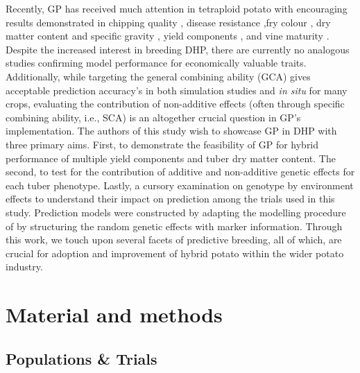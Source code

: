 Recently, GP has received much attention in tetraploid potato with encouraging results demonstrated in chipping quality \parencite{Sverrisdottir2018, Pandey2022}, disease resistance \parencite{Enciso-Rodriguez2018, Ortiz2022},fry colour \parencite{Byrne2020}, dry matter content and specific gravity \parencite{Endelman2018, Sverrisdottir2018}, yield components \parencite{Endelman2018, Wilson2021, Ortiz2022, Cuevas2022}, and vine maturity \parencite{Slater2016, Pandey2022}. Despite the increased interest in breeding DHP, there are currently no analogous studies confirming model performance for economically valuable traits. Additionally, while targeting the general combining ability (GCA) gives acceptable prediction accuracy's in both simulation studies and \textit{in situ} for many crops, evaluating the contribution of non-additive effects (often through specific combining ability, i.e., SCA) is an altogether crucial question in GP's implementation. The authors of this study wish to showcase GP in DHP with three primary aims. First, to demonstrate the feasibility of GP for hybrid performance of multiple yield components and tuber dry matter content. The second, to test for the contribution of additive and non-additive genetic effects for each tuber phenotype. Lastly, a cursory examination on genotype by environment effects to understand their impact on prediction among the trials used in this study. Prediction models were constructed by adapting the modelling procedure of \parencite{Adams2022} by structuring the random genetic effects with marker information. Through this work, we touch upon several facets of predictive breeding, all of which, are crucial for adoption and improvement of hybrid potato within the wider potato industry.


\section{Material and methods}

\subsection{Populations \& Trials}

